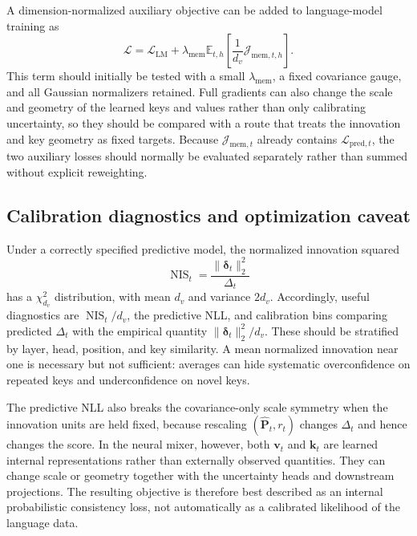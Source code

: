 \documentclass[11pt]{article}
\newcommand{\vct}[1]{\boldsymbol{#1}}
\begin{document}
A dimension-normalized auxiliary objective can be added to language-model training as
\begin{equation}
  \mathcal{L}
  =\mathcal{L}_{\mathrm{LM}}
  +\lambda_{\mathrm{mem}}
    \mathbb{E}_{t,h}\!\left[
      \frac{1}{d_v}\mathcal{J}_{\mathrm{mem},t,h}
    \right].
  \label{eq:discussion-lm-plus-memory-elbo}
\end{equation}
This term should initially be tested with a small $\lambda_{\mathrm{mem}}$, a fixed covariance
gauge, and all Gaussian normalizers retained. Full gradients can also change the scale and geometry
of the learned keys and values rather than only calibrating uncertainty, so they should be compared
with a route that treats the innovation and key geometry as fixed targets. Because
$\mathcal{J}_{\mathrm{mem},t}$ already contains $\mathcal{L}_{\mathrm{pred},t}$, the two auxiliary
losses should normally be evaluated separately rather than summed without explicit reweighting.

\subsection{Calibration diagnostics and optimization caveat}

Under a correctly specified predictive model, the normalized innovation squared
\begin{equation}
  \operatorname{NIS}_t
  =\frac{\|\vct{\delta}_t\|_2^2}{\Delta_t}
  \label{eq:discussion-normalized-innovation-squared}
\end{equation}
has a $\chi^2_{d_v}$ distribution, with mean $d_v$ and variance $2d_v$. Accordingly, useful
diagnostics are $\operatorname{NIS}_t/d_v$, the predictive NLL, and calibration bins comparing
predicted $\Delta_t$ with the empirical quantity
$\|\vct{\delta}_t\|_2^2/d_v$. These should be stratified by layer, head, position, and key
similarity. A mean normalized innovation near one is necessary but not sufficient: averages can
hide systematic overconfidence on repeated keys and underconfidence on novel keys.

The predictive NLL also breaks the covariance-only scale symmetry when the innovation units are
held fixed, because rescaling $(\widehat{\vct{P}}_t,r_t)$ changes $\Delta_t$ and hence changes the
score. In the neural mixer, however, both $\vct{v}_t$ and $\vct{k}_t$ are learned internal
representations rather than externally observed quantities. They can change scale or geometry
together with the uncertainty heads and downstream projections. The resulting objective is
therefore best described as an internal probabilistic consistency loss, not automatically as a
calibrated likelihood of the language data.
\end{document}
